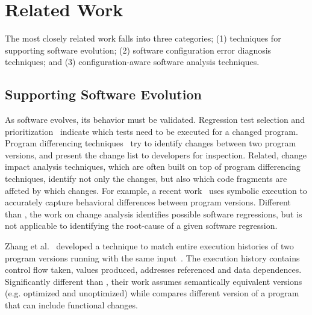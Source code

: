 \section{Related Work}
\label{sec:related}

The most closely related work falls into
three categories; (1) techniques for
supporting software evolution; (2) software
configuration error diagnosis techniques;
and (3) configuration-aware software analysis techniques.

\subsection{Supporting Software Evolution}

As software evolves, its behavior must be validated.
Regression test selection and prioritization~\cite{}
indicate which tests need to be executed for a changed
program.  Program differencing techniques~\cite{Giroux:2006:DIF, Xing:2005:UAO, Thummalapenta:2010:ESM, Kim:2013, Jin:2012:BRF,Nguyen:2010:RBF,Dig:2006:ADR, Kamiya:2002:CMT}
try to identify changes between two program versions,
and present the change list to developers for inspection.
Related, change impact analysis techniques, which
are often built on top of program differencing
techniques, identify not only the changes, but also
which code fragments are affcted by which
changes. For example, a recent work~\cite{} uses symbolic
execution to accurately capture behavioral differences
between program versions. Different than \ourtool,
the work on change analysis identifies possible
software regressions, but is not applicable to
identifying the root-cause of a given software regression.

Zhang et al.~\cite{} developed a technique to match entire
execution histories of two program versions running with
the same input~\cite{}. The execution history contains control
flow taken, values produced, addresses referenced and
data dependences. Significantly different than \ourtool, their
work assumes semantically equivalent versions (e.g. optimized
and unoptimized) while \ourtool compares different version of
a program that can include functional changes. 

